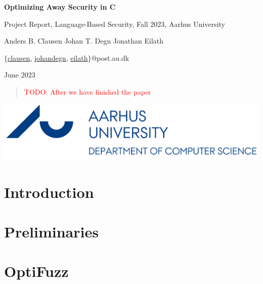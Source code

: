 \documentclass{article}
\newcommand\todo[1]{\textcolor{red}{TODO: #1}}
\begin{document}
\begin{titlepage}
  \vspace*{\fill}
  \begin{center}
    \huge
    \textbf{Optimizing Away Security in C}
        
    \vspace{0.2cm}
    \small
    Project Report, Language-Based Security, Fall 2023, Aarhus University
        
    \vspace{0.4cm}
    \large
    Anders B. Clausen \qquad Johan T. Degn \qquad Jonathan Eilath

    \vspace{0.2cm}
    \small
    $\{$\href{mailto:clausen@post.au.com}{clausen}, \href{mailto:johandegn@post.au.com}{johandegn}, \href{mailto:eilath@post.au.com}{eilath}$\}$@post.au.dk

    \vspace{0.4cm}
    June 2023
  \end{center}

  \begin{abstract}
    \todo{After we have finished the paper}
  \end{abstract}

  \vspace*{\fill}

  \begin{center}
    \includegraphics*[width=0.2\linewidth]{assets/au_logo.png}
  \end{center}
\end{titlepage}

\pagebreak

\tableofcontents

\pagebreak
{} 
\section{Introduction}


\section{Preliminaries}


\section{OptiFuzz}

\end{document}
